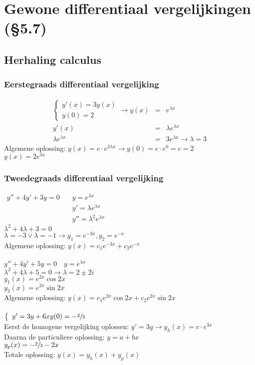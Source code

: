 \section{Gewone differentiaal vergelijkingen (\S5.7)}
\subsection{Herhaling calculus}
\subsubsection{Eerstegraads differentiaal vergelijking}
\begin{eqnarray*}
	\left\{ \begin{array}{l}
		y'(x) = 3 y(x) \\
		y(0) = 2
	\end{array}\right. \to y(x) &=& e^{\lambda x} \\
	y'(x) &=& \lambda e^{\lambda x} \\
	\lambda e^{\lambda x} &=& 3e^{\lambda x} \to \lambda = 3
\end{eqnarray*}
Algemene oplossing: $y(x) = c \cdot e^{3\lambda x} \to y(0) = c \cdot e^0 = c = 2$ \\
$y(x) = 2e^{3x}$

\subsubsection{Tweedegraads differentiaal vergelijking}
$\begin{array}{ll}
y''+ 4y'+3y = 0 \quad & y=e^{\lambda x} \\
& y'=\lambda e^{\lambda x} \\
& y'' = \lambda^2 e^{\lambda x}
\end{array}$ \\
$\lambda^2 + 4\lambda + 3 = 0$ \\
$\lambda = -3 \vee \lambda = -1 \to y_1=e^{-3x}, y_2=e^{-x}$ \\
Algemene oplossing: $y(x) = c_1 e^{-3x} + c_2 e^{-x}$
\\ \\
$y'' + 4 y' + 5y=0 \quad y=e^{\lambda x}$ \\
$\lambda^2 + 4\lambda + 5 = 0 \to \lambda = 2 \pm 2i$ \\
$y_1(x) = e^{2x} \cos 2x$ \\
$y_2(x) = e^{2x} \sin 2x$ \\
Algemene oplossing: $y(x) = c_1 e^{2x} \cos2x + c_2 e^{2x} \sin 2x$
\\ \\
$\left\{ \begin{array}{l}
	y' = 3y + 6x
	y(0) = - \sfrac{2}{3}
\end{array}\right.$ \\
Eerst de homogene vergelijking oplossen:
$y' = 3y \to y_h(x) = c \cdot e^{3x}$ \\
Daarna de particuliere oplossing: $y = a+bx$ \\
$y_p(x) = - \sfrac{2}{3} - 2x$ \\
Totale oplossing: $y(x) = y_h(x) + y_p(x)$


